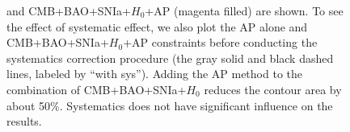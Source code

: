 \documentclass[iop]{emulateapj}
\begin{document}
\begin{figure}
{   and CMB+BAO+SNIa+$H_0$+AP (magenta filled) are shown.
   To see the effect of systematic effect, we also plot the AP alone and CMB+BAO+SNIa+$H_0$+AP constraints 
   before conducting the systematics correction procedure (the gray solid and black dashed lines, labeled by ``with sys'').
   Adding the AP method to the combination of CMB+BAO+SNIa+$H_0$ reduces the contour area by about 50\%. %
   Systematics does not have significant influence on the results.%
   }
\end{figure}
\end{document}
